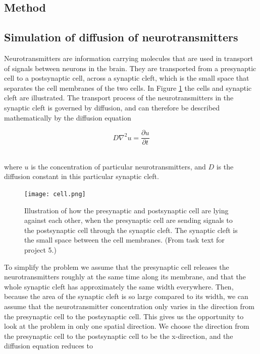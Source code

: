 \documentclass[12pt]{article}
\begin{document}
\begin{flushleft}
\newpage

\section{Method}
\subsection{Simulation of diffusion of neurotransmitters}
Neurotransmitters are information carrying molecules that are used in transport of signals between neurons in the brain. They are transported from a presynaptic cell to a postsynaptic cell, across a synaptic cleft, which is the small space that separates the cell membranes of the two cells. In Figure \ref{fig:cell} the cells and synaptic cleft are illustrated. The transport process of the neurotransmitters in the synaptic cleft is governed by diffusion, and can therefore be described mathematically by the diffusion equation

\vspace{5mm}
$$D\nabla^2u = \frac{\partial u}{\partial t}$$\\
\vspace{5mm}

where $u$ is the concentration of particular neurotransmitters, and $D$ is the diffusion constant in this particular synaptic cleft.
\begin{figure}[!h]
\begin{center}
\texttt{[image: cell.png]}
\caption{\label{fig:cell}Illustration of how the presynaptic and postsynaptic cell are lying against each other, when the presynaptic cell are sending signals to the postsynaptic cell through the synaptic cleft. The synaptic cleft is the small space between the cell membranes. (From task text for project 5.)}
\end{center}
\end{figure}

To simplify the problem we assume that the presynaptic cell releases the neurotransmitters roughly at the same time along its membrane, and that the whole synaptic cleft has approximately the same width everywhere. Then, because the area of the synaptic cleft is so large compared to its width, we can assume that the neurotransmitter concentration only varies in the direction from the presynaptic cell to the postsynaptic cell. This gives us the opportunity to look at the problem in only one spatial direction. We choose the direction from the presynaptic cell to the postsynaptic cell to be the x-direction, and the diffusion equation reduces to


\end{flushleft}
\end{document}
